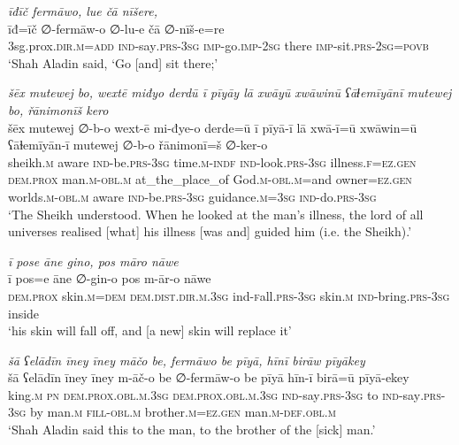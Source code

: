 \ea \label{DG.44}
\textit{īđīč fermāwo, lue čā nīšere,} \\ 
\gll īđ=īč ∅-fermāw-o ∅-lu-e čā ∅-nīš-e=re \\ 
 3sg.prox\textsc{.dir}\textsc{.m}\textsc{=add} \textsc{ind-}say\textsc{.prs}\textsc{-3sg} \textsc{imp-}go.\textsc{imp-}\textsc{2sg} there \textsc{imp-}sit\textsc{.prs}-\textsc{2sg}\textsc{=\textsc{povb}} \\ 
\glt `Shah Aladin  said, ‘Go [and] sit there;'
\z 
 
\ea \label{DG.46}
\textit{šēx mutewej bo, wextē miđyo derdū ī pīyāy lā xwāyū xwāwinū ʕāɫemīyānī mutewej bo, řānimonīš kero} \\ 
\gll šēx mutewej ∅-b-o wext-ē mi-đye-o derde=ū ī pīyā-ī lā xwā-ī=ū xwāwin=ū ʕāɫemīyān-ī mutewej ∅-b-o řānimonī=š ∅-ker-o \\ 
 sheikh\textsc{.m} aware \textsc{ind-}be\textsc{.prs}\textsc{-3sg} time\textsc{.m}\textsc{-indf} \textsc{ind-}look\textsc{.prs}\textsc{-3sg} illness\textsc{\textsc{.f}}\textsc{=ez}\textsc{.gen} \textsc{dem.prox} man\textsc{.m}\textsc{-obl}\textsc{.m} at\_the\_place\_of God\textsc{.m}\textsc{-obl}\textsc{.m}=and owner\textsc{=ez}\textsc{.gen} worlds\textsc{.m}\textsc{-obl}\textsc{.m} aware \textsc{ind-}be\textsc{.prs}\textsc{-3sg} guidance\textsc{.m}\textsc{=3sg} \textsc{ind-}do\textsc{.prs}\textsc{-3sg} \\ 
\glt `The Sheikh understood. When he looked at the man’s illness, the lord of all universes realised [what] his illness [was and] guided him (i.e. the Sheikh).'
\z 
 
\ea \label{DG.51}
\textit{ī pose āne gino, pos māro nāwe} \\ 
\gll ī pos=e āne ∅-gin-o pos m-ār-o nāwe \\ 
 \textsc{dem.prox} skin\textsc{.m}\textsc{=dem} \textsc{dem.dist}\textsc{.dir}\textsc{.m}\textsc{.3sg} ind\textsc{-f}all\textsc{.prs}\textsc{-3sg} skin\textsc{.m} \textsc{ind-}bring\textsc{.prs}\textsc{-3sg} inside \\ 
\glt `his skin will fall off, and [a new] skin will replace it'
\z 
 
\ea \label{DG.53}
\textit{šā ʕelādīn īney īney māčo be, fermāwo be pīyā, hīnī birāw pīyākey} \\ 
\gll šā ʕelādīn īney īney m-āč-o be ∅-fermāw-o be pīyā hīn-ī birā=ū pīyā-ekey \\ 
 king\textsc{.m} \textsc{pn} \textsc{dem.prox}\textsc{.obl}\textsc{.m}\textsc{.3sg} \textsc{dem.prox}\textsc{.obl}\textsc{.m}\textsc{.3sg} \textsc{ind-}say\textsc{.prs}\textsc{-3sg} to \textsc{ind-}say\textsc{.prs}\textsc{-3sg} by man\textsc{.m} \textsc{fill}\textsc{-obl}\textsc{.m} brother\textsc{.m}\textsc{=ez}\textsc{.gen} man\textsc{.m}\textsc{-def}\textsc{.obl}\textsc{.m} \\ 
\glt `Shah Aladin said this to the man, to the brother of the [sick] man.'
\z 
 
